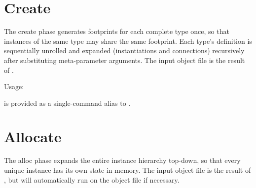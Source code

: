 \begin{comment}
\section{Unroll}
\label{sec:compiler:unroll}

The unroll phase processes top-level instantiation and connection 
statements sequentially.  Top-level meta-parameters are substituted
and expanded.  
The input object file is a compiled object file, the result of
\ttt{hackt compile}.  
If the object file is already unrolled, then the object file
is saved unchanged (essentially copied).  

Usage: \binhackt\ \ttt{unroll} \tit{in-object} \tit{out-object}

\ttt{hacunroll} is provided as a single-command alias to \ttt{hackt unroll}.  
\end{comment}

\section{Create}
\label{sec:compiler:create}

The create phase generates footprints for each complete type once, 
so that instances of the same type may share the same footprint.  
Each type's definition is sequentially unrolled and expanded 
(instantiations and connections) recursively after substituting
meta-parameter arguments.  
The input object file is the result of .  

Usage: \binhackt\   

 is provided as a single-command alias to .  

\section{Allocate}
\label{sec:compiler:alloc}

The alloc phase expands the entire instance hierarchy top-down, 
so that every unique instance has its own state in memory.  
The input object file is the result of , 
but will automatically run  on the object file if necessary.  

